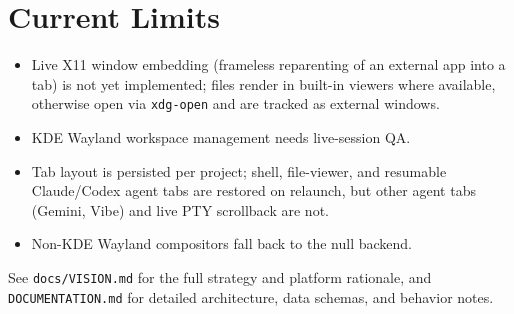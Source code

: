 \documentclass[11pt,a4paper]{article}
\newcommand{\code}[1]{\texttt{#1}}
\begin{document}
\section{Current Limits}

\begin{itemize}
  \item Live X11 window embedding (frameless reparenting of an external app into
  a tab) is not yet implemented; files render in built-in viewers where
  available, otherwise open via \code{xdg-open} and are tracked as external
  windows.
  \item KDE Wayland workspace management needs live-session QA.
  \item Tab layout is persisted per project; shell, file-viewer, and resumable
  Claude/Codex agent tabs are restored on relaunch, but other agent tabs
  (Gemini, Vibe) and live PTY scrollback are not.
  \item Non-KDE Wayland compositors fall back to the null backend.
\end{itemize}

\vfill
\begin{center}
\small\color{eldrungray}
See \code{docs/VISION.md} for the full strategy and platform rationale, and
\code{DOCUMENTATION.md} for detailed architecture, data schemas, and behavior
notes.
\end{center}
\end{document}
